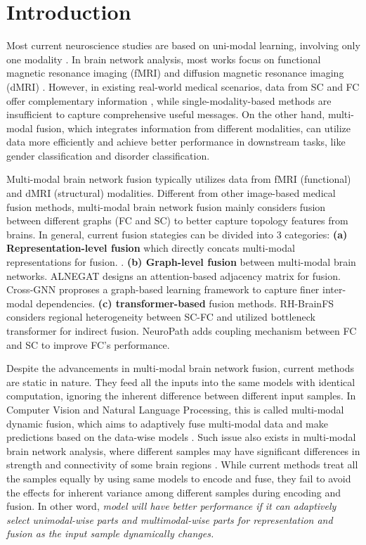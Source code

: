 \documentclass[10pt,twocolumn,letterpaper]{article}
\begin{document}
\section{Introduction}
Most current neuroscience studies are based on uni-modal learning, involving only one modality \cite{bessadok2022graph,zahid2022brainnet,winter2024systematic}. In brain network analysis, most works focus on functional magnetic resonance imaging (fMRI) \cite{yan2019reduced} and diffusion magnetic resonance imaging (dMRI) \cite{van2020white}. However, in existing real-world medical scenarios, data from SC and FC offer complementary information \cite{chu2018function}, while single-modality-based methods are insufficient to capture comprehensive useful messages. On the other hand, multi-modal fusion, which integrates information from different modalities, can utilize data more efficiently and achieve better performance in downstream tasks, like gender classification and disorder classification.

Multi-modal brain network fusion typically utilizes data from fMRI (functional) and dMRI (structural) modalities. Different from other image-based medical fusion methods, multi-modal brain network fusion mainly considers fusion between different graphs (FC and SC) to better capture topology features from brains. In general, current fusion stategies can be divided into 3 categories: \textbf{(a) Representation-level fusion} which directly concats multi-modal representations for fusion. \cite{sebenius2021multimodal,zhang2021deep,wen2024d}. \textbf{(b) Graph-level fusion} between multi-modal brain networks. ALNEGAT \cite{chen2022adversarial} designs an attention-based adjacency matrix for fusion. Cross-GNN \cite{yang2023mapping} proproses a graph-based learning framework to capture finer inter-modal dependencies. \textbf{(c) transformer-based} fusion methods. RH-BrainFS \cite{ye2024rh} considers regional heterogeneity between SC-FC and utilized bottleneck transformer for indirect fusion. NeuroPath \cite{wei2024neuropath} adds coupling mechanism between FC and SC to improve FC's performance.

Despite the advancements in multi-modal brain network fusion, current methods are static in nature. They feed all the inputs into the same models with identical computation, ignoring the inherent difference between different input samples. In Computer Vision and Natural Language Processing, this is called multi-modal dynamic fusion, which aims to adaptively fuse multi-modal data and make predictions based on the data-wise models \cite{Cao_2023_ICCV,han2022multimodal,xue2023dynamic}. Such issue also exists in multi-modal brain network analysis, where different samples may have significant differences in strength and connectivity of some brain regions \cite{basaia2024brain,duan2017degree,chou2023functional}. While current methods treat all the samples equally by using same models to encode and fuse, they fail to avoid the effects for inherent variance among different samples during encoding and fusion. In other word, \textit{model will have better performance if it can adaptively select unimodal-wise parts and multimodal-wise parts for representation and fusion as the input sample dynamically changes.} 
\end{document}
